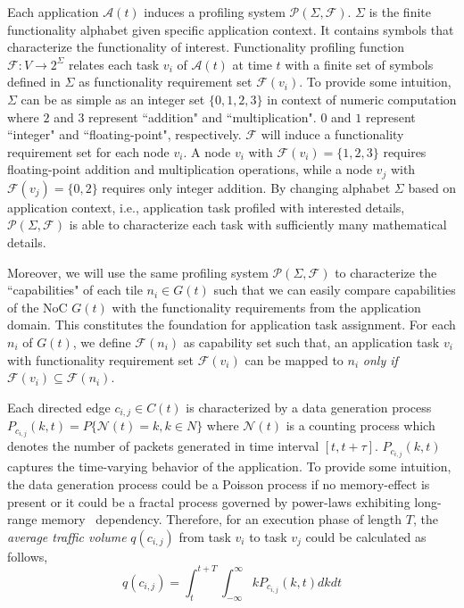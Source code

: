 {{Each application $\mathcal A(t)$ induces a profiling system $\mathcal P(\Sigma,\mathcal F)$. $\Sigma$ is the finite functionality alphabet given specific application context. It contains symbols that characterize the functionality of interest. Functionality profiling function $\mathcal F:V \rightarrow 2^{\Sigma}$ relates each task $v_{i}$ of $\mathcal A(t)$ at time $t$ with a finite set of symbols defined in $\Sigma$ as functionality requirement set $\mathcal F(v_{i})$. To provide some intuition, $\Sigma$ can be as simple as an integer set $\{0,1,2,3\}$ in context of numeric computation where $2$ and $3$ represent ``addition" and ``multiplication". $0$ and $1$ represent ``integer" and ``floating-point", respectively. $\mathcal F$ will induce a functionality requirement set for each node $v_i$. A node $v_i$ with $\mathcal F(v_i)=\{1,2,3\}$ requires floating-point addition and multiplication operations, while a node $v_j$ with $\mathcal F(v_j)=\{0,2\}$ requires only integer addition. By changing alphabet $\Sigma$ based on application context, i.e., application task profiled with interested details, $\mathcal P(\Sigma,\mathcal F)$ is able to characterize each task with sufficiently many mathematical details.

Moreover, we will use the same profiling system $\mathcal P(\Sigma,\mathcal F)$ to characterize the ``capabilities" of each tile $n_{i} \in G(t)$ such that we can easily compare capabilities of the NoC $G(t)$ with the functionality requirements from the application domain. This constitutes the foundation for application task assignment. For each $n_{i}$ of $G(t)$, we define $\mathcal F(n_i)$ as capability set such that, an application task $v_{i}$ with functionality requirement set $\mathcal F(v_i)$ can be mapped to $n_i$ \textit{only if} $\mathcal F(v_i) \subseteq \mathcal F(n_i)$. 
 
Each directed edge $c_{i,j} \in C(t)$ is characterized by a data generation process $P_{c_{i,j}}(k,t)=P\{\mathcal N(t)=k,k \in N\}$ where $\mathcal N(t)$ is a counting process which denotes the number of packets generated in time interval $[t,t+\tau]$. $P_{c_{i,j}}(k,t)$ captures the time-varying behavior of the application. To provide some intuition, the data generation process could be a Poisson process if no memory-effect is present or it could be a fractal process governed by power-laws exhibiting long-range memory \ dependency. Therefore, for an execution phase of length $T$, the \textit{average traffic volume} $q(c_{i,j})$ from task $v_i$ to task $v_j$ could be calculated as follows,
\begin{equation}\label{eq:traffic_vol}
q(c_{i,j})=\int_{t}^{t+T} \int_{-\infty}^{\infty} kP_{c_{i,j}}(k,t) dk dt
\end{equation}

}}
